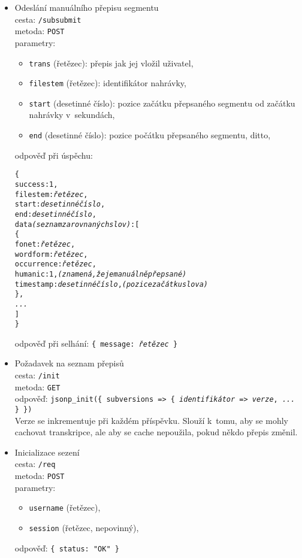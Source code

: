 \begin{itemize}
\item{
    Odeslání manuálního přepisu segmentu \\
    cesta: \texttt{/subsubmit} \\
    metoda: \texttt{POST} \\
    parametry:
    \begin{itemize}
        \item{\texttt{trans} (řetězec): přepis jak jej vložil uživatel,}
        \item{\texttt{filestem} (řetězec): identifikátor nahrávky,}
        \item{\texttt{start} (desetinné číslo): pozice začátku přepsaného segmentu od začátku nahrávky v~sekundách,}
        \item{\texttt{end} (desetinné číslo): pozice počátku přepsaného segmentu, ditto,}
    \end{itemize}
    odpověď při úspěchu: \begin{alltt}\{
        success: 1,
        filestem: {\em řetězec},
        start: {\em desetinné číslo},
        end: {\em desetinné číslo},
        data {\em (seznam zarovnaných slov)}: [ 
            \{
                fonet: {\em řetězec},
                wordform: {\em řetězec},
                occurrence: {\em řetězec},
                humanic: 1, {\em (znamená, že je manuálně přepsané)}
                timestamp: {\em desetinné číslo}, {\em (pozice začátku slova)}
            \},
            {\em ...}
        ]
    \}\end{alltt}
    odpověď při selhání: \texttt{\{ message: {\em řetězec} \}}
}
\item{
    Požadavek na seznam přepisů \\
    cesta: \texttt{/init} \\
    metoda: \texttt{GET} \\
    odpověď: \texttt{jsonp\_init(\{ subversions => \{ {\em identifikátor} => {\em verze}, {\em ...} \} \})} \\

    Verze se inkrementuje při každém příspěvku. Slouží k~tomu, aby se mohly cachovat
    transkripce, ale aby se cache nepoužila, pokud někdo přepis změnil.
}
\item{
    Inicializace sezení \\
    cesta: \texttt{/req} \\
    metoda: \texttt{POST} \\
    parametry:
    \begin{itemize}
        \item{\texttt{username} (řetězec),}
        \item{\texttt{session} (řetězec, nepovinný),}
    \end{itemize}
    odpověď: \texttt{\{ status: "OK" \}} \\

}
\end{itemize}
